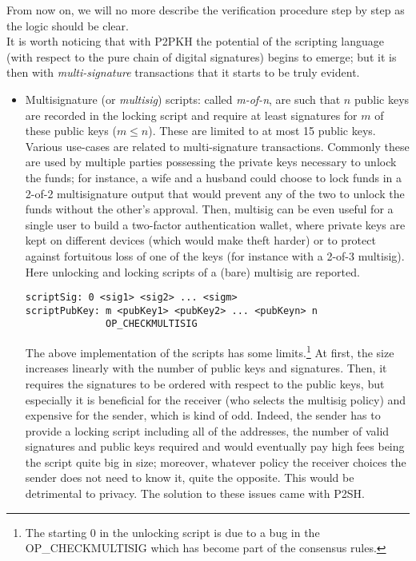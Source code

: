 \noindent
From now on, we will no more describe the verification procedure step by step as the logic should be clear.\\
It is worth noticing that with P2PKH the potential of the scripting language (with respect to the pure chain of digital signatures) begins to emerge; but it is then with \textit{multi-signature} transactions that it starts to be truly evident.
\begin{itemize}[leftmargin=*]
\item Multisignature (or \textit{multisig}) scripts: called \textit{m-of-n}, are such that $n$ public keys are recorded in the locking script and require at least signatures for $m$ of these public keys ($m \leq n$). These are limited to at most 15 public keys. Various use-cases are related to multi-signature transactions. Commonly these are used by multiple parties possessing the private keys necessary to unlock the funds; for instance, a wife and a husband could choose to lock funds in a 2-of-2 multisignature output that would prevent any of the two to unlock the funds without the other's approval. Then, multisig can be even useful for a single user to build a two-factor authentication wallet, where private keys are kept on different devices (which would make theft harder) or to protect against fortuitous loss of one of the keys (for instance with a 2-of-3 multisig). Here unlocking and locking scripts of a (bare) multisig are reported.
\begin{lstlisting}[frame=single]
scriptSig: 0 <sig1> <sig2> ... <sigm>
scriptPubKey: m <pubKey1> <pubKey2> ... <pubKeyn> n
              OP_CHECKMULTISIG
\end{lstlisting}
The above implementation of the scripts has some limits.\footnote{The starting 0 in the unlocking script is due to a bug in the OP\_CHECKMULTISIG which has become part of the consensus rules.}
At first, the size increases linearly with the number of public keys and signatures. Then, it requires the signatures to be ordered with respect to the public keys, but especially it is beneficial for the receiver (who selects the multisig policy) and expensive for the sender, which is kind of odd. Indeed, the sender has to provide a locking script including all of the addresses, the number of valid signatures and public keys required and would eventually pay high fees being the script quite big in size; moreover, whatever policy the receiver choices the sender does not need to know it, quite the opposite. This would be detrimental to privacy. The solution to these issues came with P2SH.

\end{itemize}
